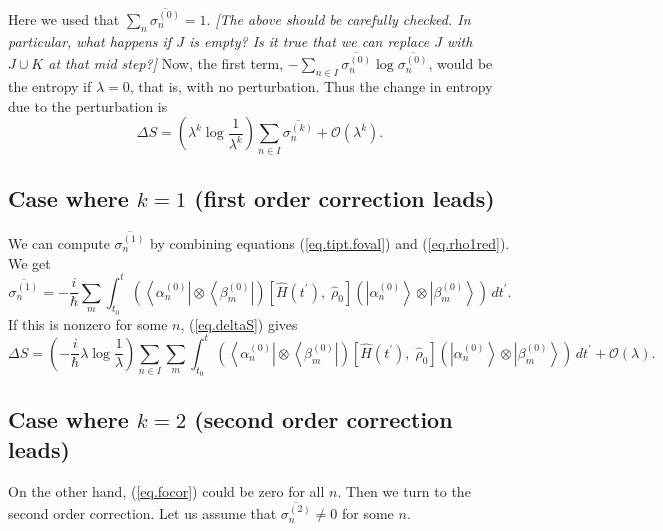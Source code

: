 \documentclass[11pt]{article}
\newcommand{\Od}[1]{\mathcal{O}{\left(#1\right)}}
\newcommand{\bra}[1]{\left\langle#1\right|}
\newcommand{\ket}[1]{\left|#1\right\rangle}
\newcommand{\op}[1]{\hat{#1}}
\theoremstyle{theorem}
\theoremstyle{remark}
\theoremstyle{step}
\theoremstyle{gap}
\begin{document}
Here we used that \(\sum_n \overline{\sigma_n^{(0)}} = 1\).
\emph{[The above should be carefully checked. In particular, what happens if \(J\) is empty? Is it true that we can replace \(J\) with \(J \cup K\) at that mid step?]}
Now, the first term, \(- \sum_{n \in I} \overline{\sigma_n^{(0)}} \log \overline{\sigma_n^{(0)}}\), would be the entropy if \(\lambda=0\), that is, with no perturbation. Thus the change in entropy due to the perturbation is
\begin{equation}\label{eq.deltaS}
\boxed{\Delta S = \left(\lambda^k\log\frac{1}{\lambda^{k}} \right)\sum_{n \in I} \overline{\sigma_n^{(k)}} + \Od{\lambda^k}.}
\end{equation}

\subsection{Case where \(k=1\) (first order correction leads)}

We can compute \(\overline{\sigma_n^{(1)}}\) by combining equations (\ref{eq.tipt.foval}) and (\ref{eq.rho1red}). We get
\begin{equation}\label{eq.focor}
\overline{\sigma_n^{(1)}} = -\frac{i}{\hbar} \sum_m\int_{t_0}^t \left(\bra{\alpha_n^{(0)}}\otimes\bra{\beta_m^{(0)}}\right) \left[\op{H}(t^\prime),\; \op{\rho}_0 \right] \left(\ket{\alpha_n^{(0)}}\otimes\ket{\beta_m^{(0)}}\right)\,dt^\prime.
\end{equation}
If this is nonzero for some \(n\), (\ref{eq.deltaS}) gives
\begin{equation}
\Delta S = \left(-\frac{i}{\hbar}\lambda\log\frac{1}{\lambda}\right) \sum_{n \in I} \sum_m \int_{t_0}^t \left(\bra{\alpha_n^{(0)}}\otimes\bra{\beta_m^{(0)}}\right) \left[\op{H}(t^\prime),\; \op{\rho}_0 \right] \left(\ket{\alpha_n^{(0)}}\otimes\ket{\beta_m^{(0)}}\right)\,dt^\prime + \Od{\lambda}.
\end{equation}

\subsection{Case where \(k=2\) (second order correction leads)}

On the other hand, (\ref{eq.focor}) could be zero for all \(n\). Then we turn to the second order correction. Let us assume that \(\overline{\sigma_n^{(2)}} \neq 0\) for some \(n\).
\end{document}

